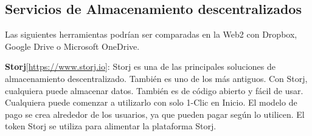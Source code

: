 \hfill \break
\subsection*{Servicios de Almacenamiento descentralizados}
\label{webs-almacenamiento}
Las siguientes herramientas podrían ser comparadas en la Web2 con Dropbox, Google
Drive o Microsoft OneDrive.

\hfill \break
\textbf{Storj}[\url{https://www.storj.io}]: Storj es una de las principales soluciones de almacenamiento
descentralizado. También es uno de los más antiguos. Con Storj, cualquiera
puede almacenar datos. También es de código abierto y fácil de usar. Cualquiera
puede comenzar a utilizarlo con solo 1-Clic en Inicio. El modelo de pago se
crea alrededor de los usuarios, ya que pueden pagar según lo utilicen. El token
Storj se utiliza para alimentar la plataforma Storj.

